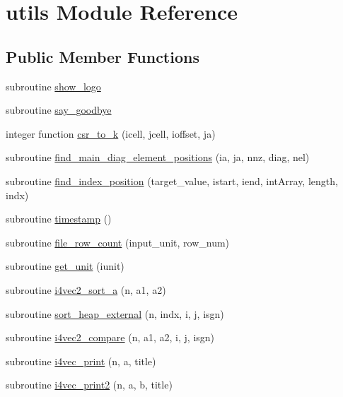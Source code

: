 \hypertarget{classutils}{\section{utils Module Reference}
\label{classutils}
}
\subsection*{Public Member Functions}
\begin{DoxyCompactItemize}
\item 
subroutine \hyperlink{classutils_aa2b73136c7bb22d03472ef1b10438d0e}{show\-\_\-logo}
\item 
subroutine \hyperlink{classutils_ad708b6195ad758d61b255161ac20d617}{say\-\_\-goodbye}
\item 
integer function \hyperlink{classutils_a21dbaa7b30cbd5b1723b22a64db81bfd}{csr\-\_\-to\-\_\-k} (icell, jcell, ioffset, ja)
\item 
subroutine \hyperlink{classutils_ac9bece4ee87f87f5ac284876431bdd41}{find\-\_\-main\-\_\-diag\-\_\-element\-\_\-positions} (ia, ja, nnz, diag, nel)
\item 
subroutine \hyperlink{classutils_a922ea92783018263c65c651d1fd939bc}{find\-\_\-index\-\_\-position} (target\-\_\-value, istart, iend, int\-Array, length, indx)
\item 
subroutine \hyperlink{classutils_a399dfe72f2bba356257807b8ddf2540b}{timestamp} ()
\item 
subroutine \hyperlink{classutils_afeae93498668a901c97062ea8c7da8b3}{file\-\_\-row\-\_\-count} (input\-\_\-unit, row\-\_\-num)
\item 
subroutine \hyperlink{classutils_a4c02ab80fe8c45c48f93d44158999277}{get\-\_\-unit} (iunit)
\item 
subroutine \hyperlink{classutils_a8b21cdbd108f01d8b9c409cdac3d5283}{i4vec2\-\_\-sort\-\_\-a} (n, a1, a2)
\item 
subroutine \hyperlink{classutils_aebd984aa8e9a5f85b3545273652ee28f}{sort\-\_\-heap\-\_\-external} (n, indx, i, j, isgn)
\item 
subroutine \hyperlink{classutils_ab4fc73a151af25df823b1e7bcc475c3f}{i4vec2\-\_\-compare} (n, a1, a2, i, j, isgn)
\item 
subroutine \hyperlink{classutils_ac743c893a742994ba79088f917aa66b1}{i4vec\-\_\-print} (n, a, title)
\item 
subroutine \hyperlink{classutils_a34a8ef81d609bb2f52d645de2b5eb198}{i4vec\-\_\-print2} (n, a, b, title)
\item 

\end{DoxyCompactItemize}
